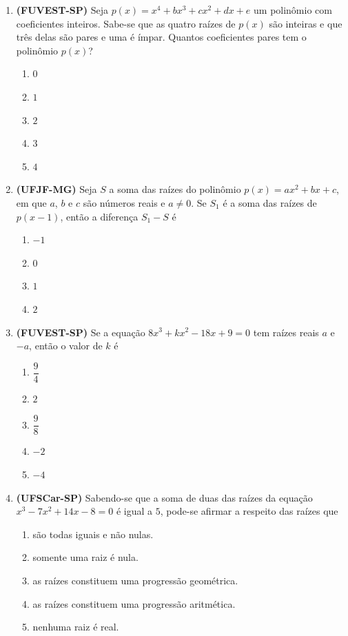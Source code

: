 \documentclass[12pt,a4paper]{article}
\begin{document}
\begin{enumerate}
    \item \textbf{(FUVEST-SP)} Seja $p(x) = x^4 + bx^3 + cx^2 + dx + e$ um polinômio com coeficientes inteiros. Sabe-se que as quatro raízes de $p(x)$ são inteiras e que três delas são pares e uma é ímpar. Quantos coeficientes pares tem o polinômio $p(x)$?
    \begin{enumerate}
        \item $0$
        \item $1$
        \item $2$
        \item $3$
        \item $4$
    \end{enumerate}

    \vspace{0.3cm}

    \item \textbf{(UFJF-MG)} Seja $S$ a soma das raízes do polinômio $p(x) = ax^2 + bx + c$, em que $a$, $b$ e $c$ são números reais e $a \ne 0$. Se $S_1$ é a soma das raízes de $p(x - 1)$, então a diferença $S_1 - S$ é
    \begin{enumerate}
        \item $-1$
        \item $0$
        \item $1$
        \item $2$
    \end{enumerate}

    \vspace{0.3cm}

    \item \textbf{(FUVEST-SP)} Se a equação $8x^3 + kx^2 - 18x + 9 = 0$ tem raízes reais $a$ e $-a$, então o valor de $k$ é
    \begin{enumerate}
        \item $\dfrac{9}{4}$
        \item $2$
        \item $\dfrac{9}{8}$
        \item $-2$
        \item $-4$
    \end{enumerate}

    \vspace{0.3cm}

    \item \textbf{(UFSCar-SP)} Sabendo-se que a soma de duas das raízes da equação $x^3 - 7x^2 + 14x - 8 = 0$ é igual a $5$, pode-se afirmar a respeito das raízes que
    \begin{enumerate}
        \item são todas iguais e não nulas.
        \item somente uma raiz é nula.
        \item as raízes constituem uma progressão geométrica.
        \item as raízes constituem uma progressão aritmética.
        \item nenhuma raiz é real.
    \end{enumerate}


\end{enumerate}
\end{document}
